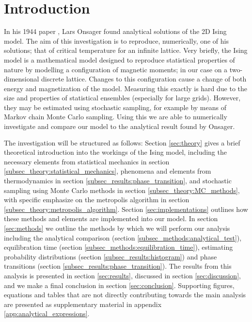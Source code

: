 \section{Introduction}\label{sec:introduction}

In his 1944 paper \cite{Onsager_Ising2D}, Lars Onsager found analytical solutions of the 2D Ising model. The aim of this investigation is to reproduce, numerically, one of his solutions; that of critical temperature for an infinite lattice. Very briefly, the Ising model is a mathematical model designed to reproduce statistical properties of nature by modelling a configuration of magnetic moments; in our case on a two-dimensional discrete lattice. Changes to this configuration cause a change of both energy and magnetization of the model. Measuring this exactly is hard due to the size and properties of statistical ensembles (especially for large grids). However, they may be estimated using stochastic sampling, for example by means of Markov chain Monte Carlo sampling. Using this we are able to numerically investigate and compare our model to the analytical result found by Onsager. 

The investigation will be structured as follows: Section \ref{sec:theory} gives a brief theoretical introduction into the workings of the Ising model, including the necessary elements from statistical mechanics in section \ref{subsec_theory:statistical_mechanics}, phenomena and elements from thermodynamics in section \ref{subsec_results:phase_transition}, and stochastic sampling using Monte Carlo methods in section \ref{subsec_theory:MC_methods}, with specific emphasize on the metropolis algorithm in section \ref{subsec_theory:metropolis_algorithm}. Section \ref{sec:implementations} outlines how these methods and elements are implemented into our model. In section  \ref{sec:methods} we outline the methods by which we will perform our analysis including the analytical comparison (section \ref{subsec_methods:analytical_test}), equilibration time (section \ref{subsec_methods:equilibration_time}), estimating probability distributions (section \ref{subsec_results:histogram}) and phase transitions (section \ref{subsec_results:phase_transition}). The results from this analysis is presented in section \ref{sec:results}, discussed in section \ref{sec:discussion}, and we make a final conclusion in section \ref{sec:conclusion}. Supporting figures, equations and tables that are not directly contributing towards the main analysis are presented as supplementary material in appendix \ref{app:analytical_expressions}.

